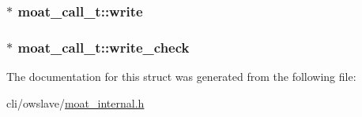 \hypertarget{structmoat__call__t_a2939e23081a18f1cb41df7f55e8c2c6a}{
\subsubsection[{write}]{$\ast$ moat\-\_\-call\-\_\-t\-::write}}\label{structmoat__call__t_a2939e23081a18f1cb41df7f55e8c2c6a}
\hypertarget{structmoat__call__t_ae99579d7f92a1edcb167dfe47fd9e283}{
\subsubsection[{write\-\_\-check}]{$\ast$ moat\-\_\-call\-\_\-t\-::write\-\_\-check}}\label{structmoat__call__t_ae99579d7f92a1edcb167dfe47fd9e283}


The documentation for this struct was generated from the following file\-:\begin{DoxyCompactItemize}
\item 
cli/owslave/\hyperlink{moat__internal_8h}{moat\-\_\-internal.\-h}\end{DoxyCompactItemize}

